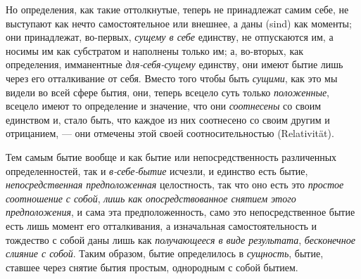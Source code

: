 Но определения, как такие оттолкнутые, теперь не принадлежат самим себе, не
выступают как нечто самостоятельное или внешнее, а даны (sind) как моменты;
они принадлежат, во-первых, {\em сущему в себе}
единству, не отпускаются им, а носимы им как субстратом и наполнены только
им; а, во-вторых, как определения, имманентные
{\em для-себя-сущему} единству, они имеют бытие лишь
через его отталкивание от себя. Вместо того чтобы быть
{\em сущими}, как это мы видели во всей сфере бытия,
они, теперь всецело суть только {\em положенные},
всецело имеют то определение и значение, что они
{\em соотнесены} со своим единством и, стало быть, что
каждое из них соотнесено со своим другим и отрицанием, — они отмечены этой
своей соотносительностью (Relativität).

Тем самым бытие вообще и как бытие или непосредственность различенных
определенностей, так и {\em в-себе-бытие} исчезли, и
единство есть бытие, {\em непосредственная
предположенная} целостность, так что оно есть это
{\em простое соотношение с собой},
{\em лишь как опосредствованное снятием этого
предположения}, и сама эта предположенность, само это непосредственное
бытие есть лишь момент его отталкивания, а изначальная самостоятельность и
тождество с собой даны лишь как {\em получающееся в
виде результата}, {\em бесконечное слияние с собой}.
Таким образом, бытие определилось в {\em сущность},
бытие, ставшее через снятие бытия простым, однородным с собой бытием.

